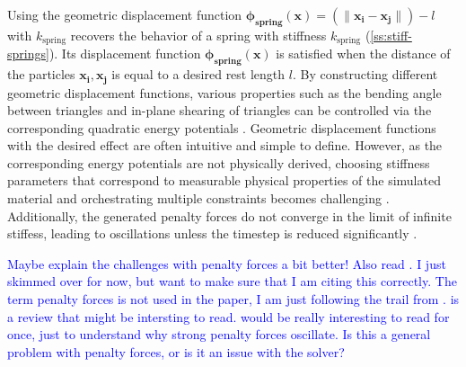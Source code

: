 Using the geometric displacement function $\bm{\phi_{\text{spring}}(x)} = (\lVert \bm{x_i} - \bm{x_j} \rVert) - l$ with $k_{\text{spring}}$ 
recovers the behavior of a spring with stiffness $k_{\text{spring}}$ (\cref{ss:stiff-springs}). Its displacement function 
$\bm{\phi_{\text{spring}}(x)}$ is satisfied when the distance of the particles $\bm{x_i}, \bm{x_j}$ is equal to a desired rest length $l$. 
By constructing different geometric displacement functions, various properties such as the bending angle between triangles and in-plane 
shearing of triangles can be controlled via the corresponding quadratic energy potentials \cite{baraff1998}. Geometric displacement 
functions with the desired effect are often intuitive and simple to define. However, as the corresponding energy potentials are not physically 
derived, choosing stiffness parameters that correspond to measurable physical properties of the simulated material and orchestrating 
multiple constraints becomes challenging \cite{servin2006, nealen2006}. Additionally, the generated penalty forces do not converge in the 
limit of infinite stiffess, leading to oscillations unless the timestep is reduced significantly \cite{rubin1957}.

\textcolor{blue}{Maybe explain the challenges with penalty forces a bit better! Also read \cite{terz1987, nealen2006, rubin1957}. 
I just skimmed over \cite{terz1987} for now, but want to make sure that I am citing this correctly. The term penalty forces is not used
in the paper, I am just following the trail from \cite{servin2006}. \cite{nealen2006} is a review that might be intersting to read.
\cite{rubin1957} would be really interesting to read for once, just to understand why strong penalty forces oscillate. Is this a
general problem with penalty forces, or is it an issue with the solver?}

